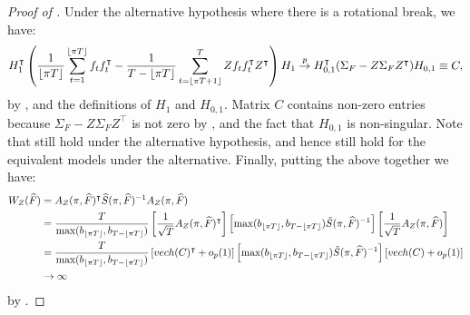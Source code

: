 \documentclass[12pt]{article}
\newcommand*{\tran}{\intercal}
\theoremstyle{plain}
\numberwithin{equation}{section}
\begin{document}
\begin{proof}[Proof of ]
Under the alternative hypothesis where there is a rotational break, we have:
\begin{align*}
H_1^\tran 
\left( 
\frac{1}{\floor{\pi T}} 
\sumTfloor f_t f_t^\tran 
- \frac{1}{T - \floor{\pi T}}
\sumTfloort Z f_t f_t^\tran Z^\tran
\right) 
H_1 \convp
H_{0, 1}^\tran (\Sigma_F - Z \Sigma_F Z^\tran ) H_{0, 1} \equiv C,
\end{align*}
by , and the definitions of $H_1$ and $H_{0, 1}$. Matrix $C$ contains non-zero entries because $\Sigma_F - Z \Sigma_F Z^\tran$ is not zero by , and the fact that $H_{0, 1}$ is non-singular. Note that  still hold under the alternative hypothesis, and hence  still hold for the equivalent models under the alternative. 
Finally, putting the above together we have:
\begin{align*}
W_{Z}(\widehat{F}) 
&= A_{Z}(\pi, \widehat{F})^\tran \widehat{S}(\pi, \widehat{F})^{-1} A_Z(\pi, \widehat{F}) \\
&= \frac{T}{\operatorname{max}
(b_{\floor{\pi T}}, b_{T - \floor{\pi T}})} 
\left[ \frac{1}{\sqrt{T}} A_Z(\pi, \widehat{F})^\tran \right]
\left[ \operatorname{max}
(b_{\floor{\pi T}}, b_{T - \floor{\pi T}}) \tilde{S}(\pi, \widehat{F})^{-1} \right]
\left[ \frac{1}{\sqrt{T}} A_Z(\pi, \widehat{F}) \right] \\
&= \frac{T}{\operatorname{max}
(b_{\floor{\pi T}}, b_{T - \floor{\pi T}})} 
\left[ vech(C)^\tran + o_p(1) \right]
\left[ \operatorname{max}
(b_{\floor{\pi T}}, b_{T - \floor{\pi T}}) \tilde{S}(\pi, \widehat{F})^{-1} \right]
\left[ vech(C) + o_p(1) \right] \\
&\to \infty
\end{align*}
by .
\end{proof}

\end{document}
